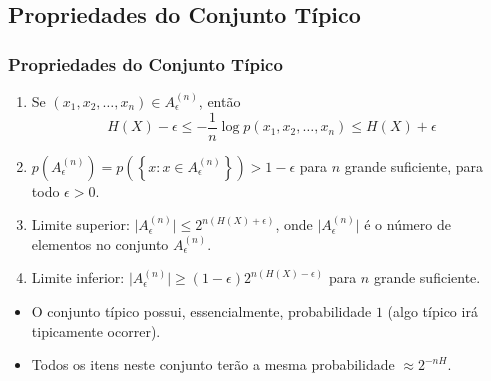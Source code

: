 \subsection{Propriedades do Conjunto Típico}
\begin{frame}%
  \frametitle{Propriedades do Conjunto Típico}
  \begin{theorem}
  \begin{enumerate}
  \item Se $(x_1, x_2, \ldots, x_n) \in A_\epsilon^{(n)}$, então
        \begin{equation}
        H(X) - \epsilon \leq - \frac{1}{n} \log p(x_1, x_2, \ldots, x_n) \leq H(X) + \epsilon
        \end{equation}
  \item $p(A_\epsilon^{(n)}) = p\left( \left\{ x: x \in A_\epsilon^{(n)} \right\} \right) > 1 - \epsilon$ para $n$ grande suficiente, para todo $\epsilon > 0$.
  \item Limite superior: $\vert A_\epsilon^{(n)} \vert \leq 2^{n(H(X)+\epsilon)}$, onde $\vert A_\epsilon^{(n)} \vert$ é o número de elementos no conjunto $A_\epsilon^{(n)}$.
  \item Limite inferior: $\vert A_\epsilon^{(n)} \vert \geq (1-\epsilon) 2^{n(H(X) - \epsilon)}$ para $n$ grande suficiente.
  \end{enumerate}
  \end{theorem}

  \begin{itemize}
  \item O conjunto típico possui, essencialmente, probabilidade $1$ (algo típico irá tipicamente ocorrer).
  \item Todos os itens neste conjunto terão a mesma probabilidade $\approx 2^{-nH}$.
  \end{itemize}
\end{frame}


